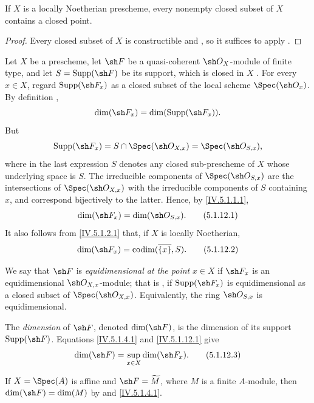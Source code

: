 \begin{corollary}[5.1.11]
\label{IV.5.1.11}
If $X$ is a locally Noetherian prescheme, every nonempty closed
subset of $X$ contains a closed point.
\end{corollary}

\begin{proof}
Every closed subset of $X$ is constructible
 and , so it suffices to apply
.
\end{proof}

\begin{env}[5.1.12]
\label{IV.5.1.12}
Let $X$ be a prescheme, let $\sh F$ be a quasi-coherent
$\sh O_X$-module of finite type, and let
$S=\operatorname{Supp}(\sh F)$ be its support, which is closed in
$X$ .
For every $x\in X$, regard $\operatorname{Supp}(\sh F_x)$ as a closed
subset of the local scheme $\Spec(\sh O_x)$.
By definition ,
\[
\dim(\sh F_x)=\dim(\operatorname{Supp}(\sh F_x)).
\]
But
\[
\operatorname{Supp}(\sh F_x)
  =S\cap\Spec(\sh O_{X,x})
  =\Spec(\sh O_{S,x}),
\]
where in the last expression $S$ denotes any closed sub-prescheme of
$X$ whose underlying space is $S$.
The irreducible components of $\Spec(\sh O_{S,x})$ are the
intersections of $\Spec(\sh O_{X,x})$ with the irreducible components
of $S$ containing $x$, and correspond bijectively to the latter.
Hence, by \eqref{IV.5.1.1.1},
\begin{equation}
\dim(\sh F_x)=\dim(\sh O_{S,x}).
\tag{5.1.12.1}\label{IV.5.1.12.1}
\end{equation}
It also follows from \eqref{IV.5.1.2.1} that, if $X$ is locally
Noetherian,
\begin{equation}
\dim(\sh F_x)=\operatorname{codim}(\overline{\{x\}},S).
\tag{5.1.12.2}\label{IV.5.1.12.2}
\end{equation}

We say that $\sh F$ is \emph{equidimensional at the point} $x\in X$
if $\sh F_x$ is an equidimensional $\sh O_{X,x}$-module; that is
, if $\operatorname{Supp}(\sh F_x)$ is
equidimensional as a closed subset of $\Spec(\sh O_{X,x})$.
Equivalently, the ring $\sh O_{S,x}$ is equidimensional.

The \emph{dimension} of $\sh F$, denoted $\dim(\sh F)$, is the
dimension of its support $\operatorname{Supp}(\sh F)$.
Equations \eqref{IV.5.1.4.1} and \eqref{IV.5.1.12.1} give
\begin{equation}
\dim(\sh F)=\sup_{x\in X}\dim(\sh F_x).
\tag{5.1.12.3}\label{IV.5.1.12.3}
\end{equation}

If $X=\Spec(A)$ is affine and $\sh F=\widetilde M$, where $M$ is a
finite $A$-module, then
$\dim(\sh F)=\dim(M)$ by  and
\eqref{IV.5.1.4.1}.
\end{env}

